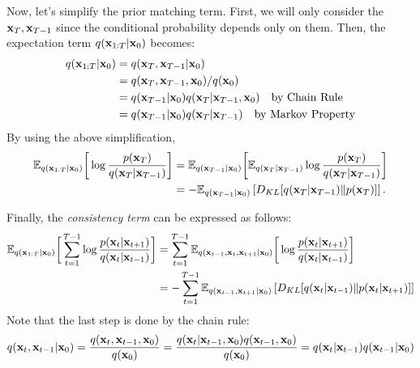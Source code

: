 Now, let's simplify the prior matching term. First, we will only consider the ${\mathbf{x}}_T, {\mathbf{x}}_{T-1}$ since the conditional probability depends only on them. Then, the expectation term $q({\mathbf{x}}_{1:T}|{\mathbf{x}}_0)$ becomes:
\begin{align*}
	q({\mathbf{x}}_{1:T}|{\mathbf{x}}_0) &= q({\mathbf{x}}_{T},{\mathbf{x}}_{T-1}|{\mathbf{x}}_0)\\
						 &= q({\mathbf{x}}_{T},{\mathbf{x}}_{T-1},{\mathbf{x}}_0)/q({\mathbf{x}}_0)\\
						 &= q({\mathbf{x}}_{T-1}|{\mathbf{x}}_0)q({\mathbf{x}}_T|{\mathbf{x}}_{T-1},{\mathbf{x}}_0) \quad \text{by Chain Rule}\\
						 &= q({\mathbf{x}}_{T-1}|{\mathbf{x}}_0)q({\mathbf{x}}_T|{\mathbf{x}}_{T-1}) \quad \text{by Markov Property}
\end{align*}
By using the above simplification,
\begin{align*}
	\mathbb{E}_{q({\mathbf{x}}_{1:T}|{\mathbf{x}}_0)}\bigg[\log \frac{p({\mathbf{x}}_T)}{q({\mathbf{x}}_T|{\mathbf{x}}_{T-1})}\bigg] &= \mathbb{E}_{q({\mathbf{x}}_{T-1}|{\mathbf{x}}_0)}\bigg[\mathbb{E}_{q({\mathbf{x}}_{T}|{\mathbf{x}}_{T-1})} \log \frac{p({\mathbf{x}}_T)}{q({\mathbf{x}}_T|{\mathbf{x}}_{T-1})}\bigg]\\ 
																							 &= -\mathbb{E}_{q({\mathbf{x}}_{T-1}|{\mathbf{x}}_0)}\left[D_{KL}[ q({\mathbf{x}}_{T}|{\mathbf{x}}_{T-1}) \| p({\mathbf{x}}_T) ]\right].
\end{align*}

Finally, the \textit{consistency term} can be expressed as follows:
\begin{align*}
	\mathbb{E}_{q({\mathbf{x}}_{1:T}|{\mathbf{x}}_0)}\bigg[\sum_{t=1}^{T-1}\log \frac{ p({\mathbf{x}}_{t}|{\mathbf{x}}_{t+1})}{q({\mathbf{x}}_{t}|{\mathbf{x}}_{t-1})}\bigg] &= \sum_{t=1}^{T-1}\mathbb{E}_{q({\mathbf{x}}_{t-1},{\mathbf{x}}_t,{\mathbf{x}}_{t+1}|{\mathbf{x}}_0)}\bigg[\log \frac{ p({\mathbf{x}}_{t}|{\mathbf{x}}_{t+1})}{q({\mathbf{x}}_{t}|{\mathbf{x}}_{t-1})}\bigg]\\
																															 &= - \sum_{t=1}^{T-1} \mathbb{E}_{q({\mathbf{x}}_{t-1},{\mathbf{x}}_{t+1}|{\mathbf{x}}_0)}\left[D_{KL}[q({\mathbf{x}}_{t}|{\mathbf{x}}_{t-1})\|p({\mathbf{x}}_{t}|{\mathbf{x}}_{t+1})]\right]
\end{align*}
Note that the last step is done by the chain rule:
\begin{align*}
	q({\mathbf{x}}_{t}, {\mathbf{x}}_{t-1}|{\mathbf{x}}_0) = \frac{q({\mathbf{x}}_{t}, {\mathbf{x}}_{t-1},{\mathbf{x}}_0)}{q({\mathbf{x}}_0)} = \frac{q({\mathbf{x}}_{t}|{\mathbf{x}}_{t-1}, {\mathbf{x}}_0)q({\mathbf{x}}_{t-1}, {\mathbf{x}}_0)}{q({\mathbf{x}}_0)} = q({\mathbf{x}}_{t}|{\mathbf{x}}_{t-1})q({\mathbf{x}}_{t-1}|{\mathbf{x}}_0)
\end{align*}

